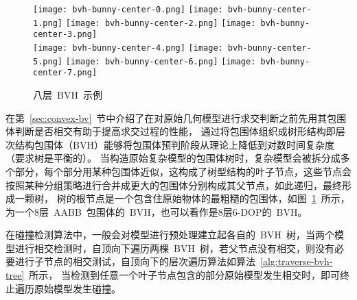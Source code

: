 \begin{figure}[htbp]
  \begin{center}
  \begin{boxedminipage}{0.87\textwidth}
  \subcaptionbox*{\label{lbl:bvh-bunny-center-0.png}}
    {\texttt{[image: bvh-bunny-center-0.png]}}
  \subcaptionbox*{\label{lbl:bvh-bunny-center-1.png}}
    {\texttt{[image: bvh-bunny-center-1.png]}}
  \subcaptionbox*{\label{lbl:bvh-bunny-center-2.png}}
    {\texttt{[image: bvh-bunny-center-2.png]}}
  \subcaptionbox*{\label{lbl:bvh-bunny-center-3.png}}
    {\texttt{[image: bvh-bunny-center-3.png]}}
    \vspace{-0.3cm}
  \\\hspace{0.5cm} 
  \subcaptionbox*{\label{lbl:bvh-bunny-center-4.png}}
    {\texttt{[image: bvh-bunny-center-4.png]}}
  \subcaptionbox*{\label{lbl:bvh-bunny-center-5.png}}
    {\texttt{[image: bvh-bunny-center-5.png]}}
  \subcaptionbox*{\label{lbl:bvh-bunny-center-6.png}}
    {\texttt{[image: bvh-bunny-center-6.png]}}
  \subcaptionbox*{\label{lbl:bvh-bunny-center-7.png}}
    {\texttt{[image: bvh-bunny-center-7.png]}}
  \vspace{-0.5cm}
  \end{boxedminipage}
\caption{八层~BVH~示例}
\label{lbl:bvh-example}
\end{center}
\end{figure}
\vspace{-12pt}
在第~\ref{sec:convex-bv}~节中介绍了在对原始几何模型进行求交判断之前先用其包围体判断是否相交有助于提高求交过程的性能，
通过将包围体组织成树形结构即层次结构包围体（BVH）能够将包围体预判阶段从理论上降低到对数时间复杂度（要求树是平衡的）。
当构造原始复杂模型的包围体树时，复杂模型会被拆分成多个部分，每个部分用某种包围体近似，这构成了树型结构的叶子节点，这些节点会按照某种分组策略进行合并成更大的包围体分别构成其父节点，如此递归，最终形成一颗树，
树的根节点是一个包含住原始物体的最粗糙的包围体，如图~\ref{lbl:bvh-example}~所示，为一个8层~AABB~包围体的~BVH，也可以看作是8层6-DOP的~BVH。

在碰撞检测算法中，一般会对模型进行预处理建立起各自的~BVH~树，当两个模型进行相交检测时，自顶向下遍历两棵~BVH~树，若父节点没有相交，则没有必要进行子节点的相交测试，自顶向下的层次遍历算法如算法~\ref{alg:traverse-bvh-tree}~所示，
当检测到任意一个叶子节点包含的部分原始模型发生相交时，即可终止遍历原始模型发生碰撞。

